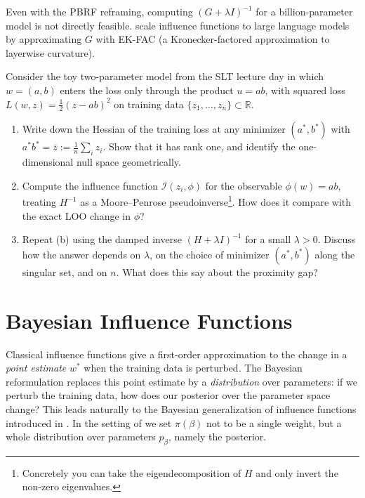 \documentclass[11pt]{article}
\begin{document}
\begin{remark}\label{rem:scaling}
Even with the PBRF reframing, computing $(G + \lambda I)^{-1}$ for a billion-parameter model is not directly feasible. \citet{grosse2023studying} scale influence functions to large language models by approximating $G$ with EK-FAC (a Kronecker-factored approximation to layerwise curvature).
\end{remark}

\begin{exercise}\label{ex:if-degenerate}
Consider the toy two-parameter model from the SLT lecture day in which $w = (a,b)$ enters the loss only through the product $u = ab$, with squared loss $L(w,z) = \tfrac12(z - ab)^2$ on training data $\{z_1,\dots,z_n\}\subset\mathbb{R}$.
\begin{enumerate}
  \item Write down the Hessian of the training loss at any minimizer $(a^*,b^*)$ with $a^* b^* = \bar z := \tfrac1n\sum_i z_i$. Show that it has rank one, and identify the one-dimensional null space geometrically.
  \item Compute the influence function $\mathcal{I}(z_i,\phi)$ for the observable $\phi(w) = ab$, treating $H^{-1}$ as a Moore--Penrose pseudoinverse\footnote{Concretely you can take the eigendecomposition of $H$ and only invert the non-zero eigenvalues.}. How does it compare with the exact LOO change in $\phi$?
  \item Repeat (b) using the damped inverse $(H + \lambda I)^{-1}$ for a small $\lambda > 0$. Discuss how the answer depends on $\lambda$, on the choice of minimizer $(a^*,b^*)$ along the singular set, and on $n$. What does this say about the proximity gap?
\end{enumerate}
\end{exercise}


\section{Bayesian Influence Functions}\label{sec:bayesian-if}

Classical influence functions give a first-order approximation to the change in a \emph{point estimate} $w^*$ when the training data is perturbed. The Bayesian reformulation replaces this point estimate by a \emph{distribution} over parameters: if we perturb the training data, how does our posterior over the parameter space change? This leads naturally to the Bayesian generalization of influence functions introduced in \citet{kreer2025bif}. In the setting of  we set $\pi(\beta)$ not to be a single weight, but a whole distribution over parameters $p_{\beta}$, namely the posterior.
\end{document}
